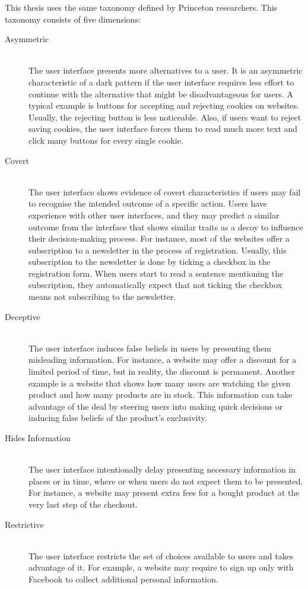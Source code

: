 This thesis uses the same taxonomy defined by Princeton researchers. This taxonomy consists of five dimensions:

\begin{description}
    \item[Asymmetric] \hfill \\ The user interface presents more alternatives to a user. It is an asymmetric characteristic of a dark pattern if the user interface requires less effort to continue with the alternative that might be disadvantageous for users. A typical example is buttons for accepting and rejecting cookies on websites. Usually, the rejecting button is less noticeable. Also, if users want to reject saving cookies, the user interface forces them to read much more text and click many buttons for every single cookie.
    \item[Covert] \hfill \\ The user interface shows evidence of covert characteristics if users may fail to recognise the intended outcome of a specific action. Users have experience with other user interfaces, and they may predict a similar outcome from the interface that shows similar traits as a decoy to influence their decision-making process. For instance, most of the websites offer a subscription to a newsletter in the process of registration. Usually, this subscription to the newsletter is done by ticking a checkbox in the registration form. When users start to read a sentence mentioning the subscription, they automatically expect that not ticking the checkbox means not subscribing to the newsletter.
    \item[Deceptive] \hfill \\ The user interface induces false beliefs in users by presenting them misleading information. For instance, a website may offer a discount for a limited period of time, but in reality, the discount is permanent. Another example is a website that shows how many users are watching the given product and how many products are in stock. This information can take advantage of the deal by steering users into making quick decisions or inducing false beliefs of the product's exclusivity.
    \item[Hides Information] \hfill \\ The user interface intentionally delay presenting necessary information in places or in time, where or when users do not expect them to be presented. For instance, a website may present extra fees for a bought product at the very last step of the checkout.
    \item[Restrictive] \hfill \\ The user interface restricts the set of choices available to users and takes advantage of it. For example, a website may require to sign up only with Facebook to collect additional personal information.
\end{description}

